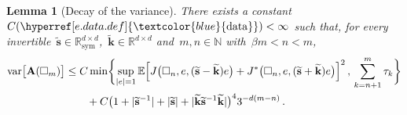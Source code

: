 \documentclass[11pt,twoside]{article} %
\let\oldsquare\square %
\renewcommand{\square}{\oldsquare}
\numberwithin{equation}{section}
\newtheorem{lemma}[theorem]{Lemma}
\theoremstyle{definition}
\newcommand{\dataref}{\hyperref[e.data.def]{\textcolor{blue}{\ensuremath{\mathrm{data}}}}}
\let\originalleft\left
\let\originalright\right
\renewcommand{\left}{\mathopen{}\mathclose\bgroup\originalleft}
\renewcommand{\right}{\aftergroup\egroup\originalright}
\newcommand*{\N}{\ensuremath{\mathbb{N}}}
\newcommand*{\R}{\ensuremath{\mathbb{R}}}
\renewcommand*{\tilde}{\widetilde}
\renewcommand{\k}{\mathbf{k}}
\newcommand{\cu}{\square}
\newcommand{\E}{\mathbb{E}}
\DeclareMathOperator{\var}{var}
\newcommand{\bfA}{\mathbf{A}}
\begin{document}
\begin{lemma}[Decay of the variance]
\label{l.flatness.nosymm}
There exists a constant~$C(\dataref)<\infty$ such that, for every invertible~$\tilde{\mathbf{s}} \in \R^{d\times d}_{\mathrm{sym}}$,~$\tilde{\k}\in \R^{d\times d}$ and~$m,n\in\N$ with~$\beta m  < n < m$,  
\begin{align}
\label{e.variance.J2.nosymm.sms}
\var \bigl[  \bfA(\cu_m) \bigr] 
&
\leq
C
\min \biggl \{
\sup_{|e|=1}
\E \left[ J\bigl (\cu_n,e,(\tilde{\mathbf{s}}-\tilde{\k}) e\bigr ) +  J^*\bigl (\cu_n,e,(\tilde{\mathbf{s}}+\tilde{\k}) e\bigr )\right]^2
\,,\, \sum_{k=n+1}^m \tau_k
\biggr\} 
\notag \\ & \qquad 
+
C\bigl(1+|\tilde{\mathbf{s}}^{-1}| + |\tilde{\mathbf{s}}| + |\tilde{\k}\tilde{\mathbf{s}}^{-1}\tilde{\k}| \bigr)^4
3^{-d (m-n)}
\,.
\end{align}
\end{lemma}
\end{document}

